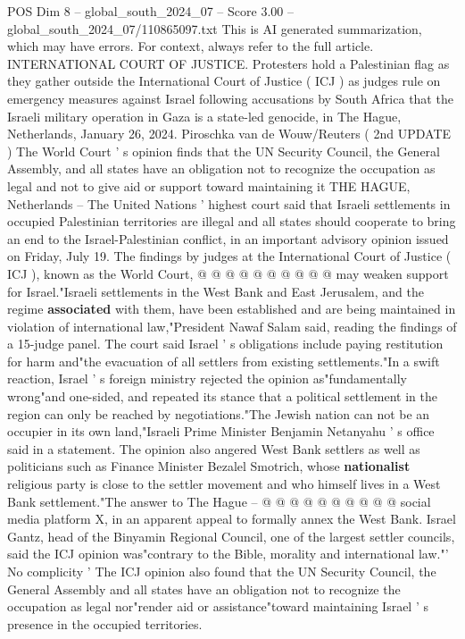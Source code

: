 \begin{textsample}{POS Dim 8 – global\_south\_2024\_07 – Score 3.00 – global\_south\_2024\_07/110865097.txt}  \label{ex:f8_pos_339}
This is AI generated summarization, which may have errors.
For context, always refer to the full article.
INTERNATIONAL COURT OF JUSTICE.
Protesters hold a Palestinian flag as they gather outside the International Court of Justice ( ICJ ) as judges rule on emergency measures against Israel following accusations by South Africa that the Israeli military operation in Gaza is a state-led genocide, in The Hague, Netherlands, January 26, 2024.
Piroschka van de Wouw/Reuters ( 2nd UPDATE ) The World Court ' s opinion finds that the UN Security Council, the General Assembly, and all states have an obligation not to recognize the occupation as legal and not to give aid or support toward maintaining it THE HAGUE, Netherlands -- The United Nations ' highest court said that Israeli settlements in occupied Palestinian territories are illegal and all states should cooperate to bring an end to the Israel-Palestinian conflict, in an important advisory opinion issued on Friday, July 19.
The findings by judges at the International Court of Justice ( ICJ ), known as the World Court, @ @ @ @ @ @ @ @ @ @ may weaken support for Israel."Israeli settlements in the West Bank and East Jerusalem, and the regime \textbf{associated} with them, have been established and are being maintained in violation of international law,"President Nawaf Salam said, reading the findings of a 15-judge panel.
The court said Israel ' s obligations include paying restitution for harm and"the evacuation of all settlers from existing settlements."In a swift reaction, Israel ' s foreign ministry rejected the opinion as"fundamentally wrong"and one-sided, and repeated its stance that a political settlement in the region can only be reached by negotiations."The Jewish nation can not be an occupier in its own land,"Israeli Prime Minister Benjamin Netanyahu ' s office said in a statement.
The opinion also angered West Bank settlers as well as politicians such as Finance Minister Bezalel Smotrich, whose \textbf{nationalist} religious party is close to the settler movement and who himself lives in a West Bank settlement."The answer to The Hague -- @ @ @ @ @ @ @ @ @ @ social media platform X, in an apparent appeal to formally annex the West Bank.
Israel Gantz, head of the Binyamin Regional Council, one of the largest settler councils, said the ICJ opinion was"contrary to the Bible, morality and international law."' No complicity ' The ICJ opinion also found that the UN Security Council, the General Assembly and all states have an obligation not to recognize the occupation as legal nor"render aid or assistance"toward maintaining Israel ' s presence in the occupied territories.

\end{textsample}
